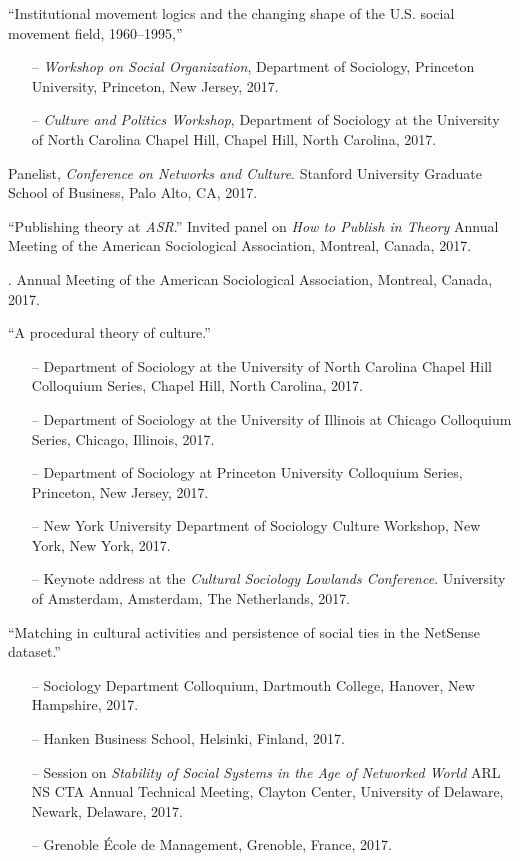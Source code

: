 \ind ``Institutional movement logics and the changing shape of the U.S. social movement field, 1960–1995,''
    \begin{itemize}[leftmargin=0.8in, topsep = 0pt]
    	\setlength\itemsep{-0.55em}
        \item[--] {\em Workshop on Social Organization}, Department of Sociology, Princeton University, Princeton, New Jersey, 2017.
        \item[--] {\em Culture and Politics Workshop}, Department of Sociology at the University of North Carolina Chapel Hill, Chapel Hill, North Carolina, 2017.
\end{itemize}

\ind Panelist, \emph{Conference on Networks and Culture}. Stanford University Graduate School of Business, Palo Alto, CA, 2017.

\ind ``Publishing theory at {\em ASR}.'' Invited panel on {\em How to Publish in Theory} Annual Meeting of the American Sociological Association, Montreal, Canada, 2017. 

. Annual Meeting of the American Sociological Association, Montreal, Canada, 2017. 

\ind ``A procedural theory of culture.'' 
	\begin{itemize}[leftmargin=0.8in, topsep = 0pt]
	\setlength\itemsep{-0.55em}
    	\item[--] Department of Sociology at the University of North Carolina Chapel Hill Colloquium Series, Chapel Hill, North Carolina, 2017.
    	\item[--] Department of Sociology at the University of Illinois at Chicago Colloquium Series, Chicago, Illinois, 2017.
    	\item[--] Department of Sociology at Princeton University Colloquium Series, Princeton, New Jersey, 2017.
      \item[--] New York University  Department of Sociology Culture Workshop, New York, New York, 2017.
    	\item[--] Keynote address at the {\em Cultural Sociology Lowlands Conference}. University of Amsterdam, Amsterdam, The Netherlands, 2017.
    \end{itemize} 

\ind ``Matching in cultural activities and persistence of social ties in the NetSense dataset.''
\begin{itemize}[leftmargin=0.8in, topsep = 0pt]
	\setlength\itemsep{-0.55em}
    \item[--] Sociology Department Colloquium, Dartmouth College, Hanover, New Hampshire, 2017.
	\item[--] Hanken Business School, Helsinki, Finland, 2017. 
    \item[--] Session on {\em Stability of Social Systems in the Age of Networked World} ARL NS CTA Annual Technical Meeting, Clayton Center, University of Delaware, Newark, Delaware, 2017.
    \item[--] Grenoble \'{E}cole de Management, Grenoble, France, 2017.
\end{itemize}

